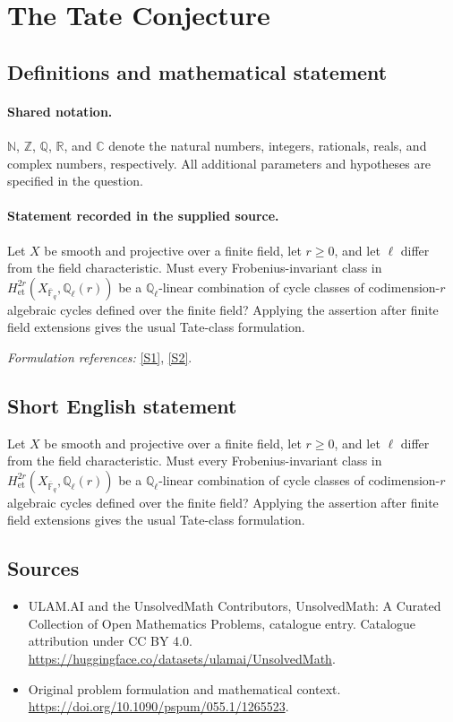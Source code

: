 \documentclass[11pt]{article}
\newcommand{\sref}[2]{\hyperlink{source:#1:#2}{[S#2]}}
\begin{document}
\section{The Tate Conjecture}\label{statement}

\subsection{Definitions and mathematical statement}

\paragraph{Shared notation.}$\mathbb N$, $\mathbb Z$, $\mathbb Q$, $\mathbb R$, and $\mathbb C$ denote the natural numbers, integers, rationals, reals, and complex numbers, respectively. All additional parameters and hypotheses are specified in the question.


\paragraph{Statement recorded in the supplied source.}
Let $X$ be smooth and projective over a finite field, let $r\geq0$, and let $\ell$ differ from the field characteristic. Must every Frobenius-invariant class in $H^{2r}_{\mathrm{et}}(X_{\overline{\mathbb F}_q},\mathbb Q_\ell(r))$ be a $\mathbb Q_\ell$-linear combination of cycle classes of codimension-$r$ algebraic cycles defined over the finite field? Applying the assertion after finite field extensions gives the usual Tate-class formulation.
\par\smallskip\textit{Formulation references:} \sref{statement}{1}, \sref{statement}{2}.
\subsection{Short English statement}
Let $X$ be smooth and projective over a finite field, let $r\geq0$, and let $\ell$ differ from the field characteristic. Must every Frobenius-invariant class in $H^{2r}_{\mathrm{et}}(X_{\overline{\mathbb F}_q},\mathbb Q_\ell(r))$ be a $\mathbb Q_\ell$-linear combination of cycle classes of codimension-$r$ algebraic cycles defined over the finite field? Applying the assertion after finite field extensions gives the usual Tate-class formulation.
\subsection{Sources}
\begin{itemize}
\item[\hypertarget{source:statement:1}{S1}] ULAM.AI and the UnsolvedMath Contributors, UnsolvedMath: A Curated Collection of Open Mathematics Problems, catalogue entry. Catalogue attribution under CC BY 4.0.
\url{https://huggingface.co/datasets/ulamai/UnsolvedMath}.
\item[\hypertarget{source:statement:2}{S2}] Original problem formulation and mathematical context.
\url{https://doi.org/10.1090/pspum/055.1/1265523}.
\end{itemize}
\label{end:statement}
\end{document}
